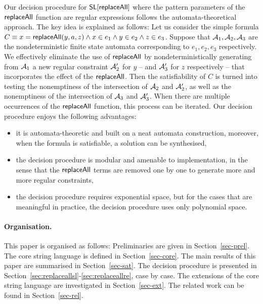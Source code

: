 Our decision procedure for $\mathsf{SL}[\mathsf{replaceAll}]$ where the pattern parameters of the $\mathsf{replaceAll}$ function are regular expressions follows the automata-theoretical approach. The key idea is explained as follows: Let us consider the simple formula $C \equiv x = \mathsf{replaceAll}(y, a, z) \wedge x \in e_1 \wedge y \in e_2 \wedge z \in e_3$. 
Suppose that $\mathcal{A}_1,\mathcal{A}_2,\mathcal{A}_3$ are the nondeterministic finite state automata corresponding to $e_1,e_2,e_3$ respectively. 
We effectively eliminate the use of $\mathsf{replaceAll}$ by nondeterministically generating from $\mathcal{A}_1$ a new regular constraint $\mathcal{A}'_2$ for $y$ -- and $\mathcal{A}'_3$ for $z$ respectively -- that incorporates the effect of the $\mathsf{replaceAll}$. Then the satisfiability of $C$ is turned into testing the nonemptiness of the intersection of $\mathcal{A}_2$ and $\mathcal{A}'_2$, as well as the nonemptiness of the intersection of $\mathcal{A}_3$ and $\mathcal{A}'_3$. When there are multiple occurrences of the $\mathsf{replaceAll}$ function, this process can be iterated. 
Our decision procedure enjoys the following advantages:
\begin{itemize}
	\item it is automata-theoretic and built on a neat automata construction, moreover, when the formula is satisfiable, a solution can be synthesised, 
	
	\item the decision procedure is modular and amenable to implementation,  in the sense that the $\mathsf{replaceAll}$ terms are removed one by one to generate more and more regular constraints,
	
	\item the decision procedure requires exponential space, but for the cases that are meaningful in practice, the decision procedure uses only polynomial space. 
\end{itemize}

%


\paragraph{Organisation.} 
This paper is organised as follows: Preliminaries are given in Section~\ref{sec-prel}. The core string language is defined in Section~\ref{sec-core}. The main results of this paper are summarised in Section~\ref{sec-sat}. The decision procedure is presented in Section~\ref{sec:replaceallsl}-\ref{sec:replaceallre}, case by case. The extensions of the core string language are investigated in Section~\ref{sec-ext}. The related work can be found in Section~\ref{sec-rel}.
